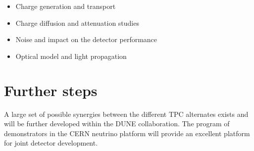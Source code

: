 \begin{itemize}

 \item Charge generation and transport 

\item Charge diffusion and attenuation	
  studies	
  
\item Noise and impact on the detector	performance	
  
\item Optical  model	 and light  propagation	
 
\end{itemize}

\section{Further steps
}

A large set of possible synergies between the different TPC alternates exists and will be further developed within the DUNE collaboration.  The program of demonstrators in the CERN neutrino platform will provide an excellent platform for joint detector development. 


